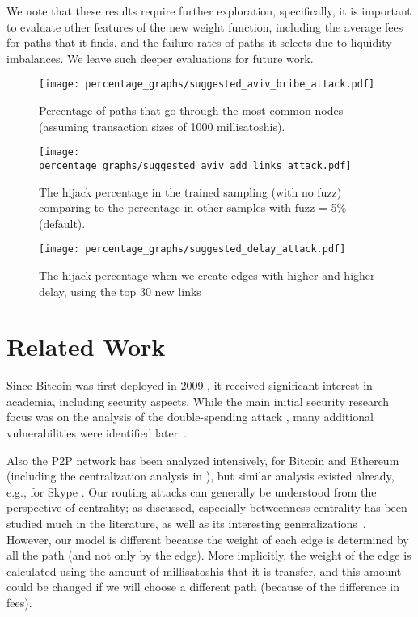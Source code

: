 We note that these results require further exploration, specifically, it is important to evaluate other features of the new weight function, including the average fees for paths that it finds, and the failure rates of paths it selects due to liquidity imbalances. We leave such deeper evaluations for future work. 

\begin{figure} 
	\centering
	\texttt{[image: percentage\_graphs/suggested\_aviv\_bribe\_attack.pdf]}
	\caption{Percentage of paths that go through the most common nodes (assuming transaction sizes of 1000 millisatoshis).}
	\label{figure::suggested_bribe_attack}
\end{figure}
\begin{figure} 
	\centering
	\texttt{[image: percentage\_graphs/suggested\_aviv\_add\_links\_attack.pdf]}
	\caption{The hijack percentage in the trained sampling (with no fuzz) comparing to the percentage in other samples with fuzz = 5\% (default).}
	\label{figure::suggested_add_links_attack}
\end{figure}
\begin{figure} 
	\centering
	\texttt{[image: percentage\_graphs/suggested\_delay\_attack.pdf]}
	\caption{The hijack percentage when we create edges with higher and higher delay, using the top 30 new links}
	\label{figure::suggested_delay_attack}
\end{figure}

\section{Related Work}\label{sec:relwork}

Since Bitcoin was first deployed in 2009 \cite{nakamoto2008bitcoin}, 
it received significant interest in academia, including security aspects.
While the main initial security research focus was on 
the analysis of the double-spending attack \cite{rosenfeld2014analysis},
many additional vulnerabilities were identified later~\cite{li2017survey}.

Also the P2P network has been analyzed intensively, 
for Bitcoin \cite{koshy2014analysis} and Ethereum \cite{kim2018measuring} (including the
centralization analysis in \cite{gencer2018decentralization}), 
but similar analysis existed already, e.g., 
for Skype \cite{guha2005experimental}. Our routing attacks can generally
be understood from the perspective of centrality; as discussed,
especially betweenness centrality has been studied much in the literature, as well as its interesting generalizations~\cite{dolev2010routing}. However, our model is different because the weight of each edge is determined by all the path (and not only by the edge). More implicitly, the weight of the edge is calculated using the amount of millisatoshis that it is transfer, and this amount could be changed if we will choose a different path (because of the difference in fees).

